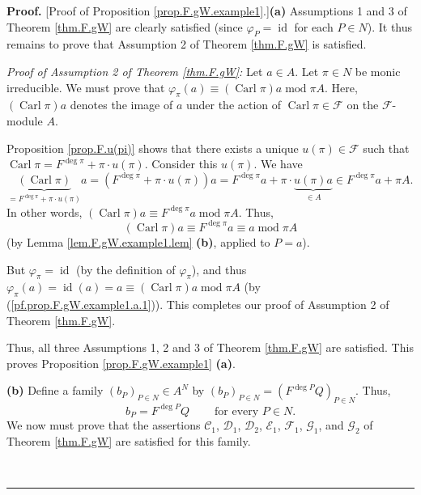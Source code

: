\documentclass[numbers=enddot,12pt,final,onecolumn,notitlepage]{scrartcl}%
\theoremstyle{definition}
\newenvironment{proof}[1][Proof]{\noindent\textbf{#1.} }{\ \rule{0.5em}{0.5em}}
\begin{document}
\begin{proof}
[Proof of Proposition \ref{prop.F.gW.example1}.]\textbf{(a)} Assumptions 1 and
3 of Theorem \ref{thm.F.gW} are clearly satisfied (since $\varphi
_{P}=\operatorname*{id}$ for each $P\in N$). It thus remains to prove that
Assumption 2 of Theorem \ref{thm.F.gW} is satisfied.

\textit{Proof of Assumption 2 of Theorem \ref{thm.F.gW}:} Let $a\in A$. Let
$\pi\in N$ be monic irreducible. We must prove that $\varphi_{\pi}\left(
a\right)  \equiv\left(  \operatorname*{Carl}\pi\right)  a\operatorname{mod}\pi
A$. Here, $\left(  \operatorname*{Carl}\pi\right)  a$ denotes the image of $a$
under the action of $\operatorname*{Carl}\pi\in\mathcal{F}$ on the
$\mathcal{F}$-module $A$.

Proposition \ref{prop.F.u(pi)} shows that there exists a unique $u\left(
\pi\right)  \in\mathcal{F}$ such that $\operatorname*{Carl}\pi=F^{\deg\pi}%
+\pi\cdot u\left(  \pi\right)  $. Consider this $u\left(  \pi\right)  $. We
have%
\[
\underbrace{\left(  \operatorname*{Carl}\pi\right)  }_{=F^{\deg\pi}+\pi\cdot
u\left(  \pi\right)  }a=\left(  F^{\deg\pi}+\pi\cdot u\left(  \pi\right)
\right)  a=F^{\deg\pi}a+\pi\cdot\underbrace{u\left(  \pi\right)  a}_{\in A}\in
F^{\deg\pi}a+\pi A.
\]
In other words, $\left(  \operatorname*{Carl}\pi\right)  a\equiv F^{\deg\pi
}a\operatorname{mod}\pi A$. Thus,%
\begin{equation}
\left(  \operatorname*{Carl}\pi\right)  a\equiv F^{\deg\pi}a\equiv
a\operatorname{mod}\pi A \label{pf.prop.F.gW.example1.a.1}%
\end{equation}
(by Lemma \ref{lem.F.gW.example1.lem} \textbf{(b)}, applied to $P=a$).

But $\varphi_{\pi}=\operatorname*{id}$ (by the definition of $\varphi_{\pi}$),
and thus $\varphi_{\pi}\left(  a\right)  =\operatorname*{id}\left(  a\right)
=a\equiv\left(  \operatorname*{Carl}\pi\right)  a\operatorname{mod}\pi A$ (by
(\ref{pf.prop.F.gW.example1.a.1})). This completes our proof of Assumption 2
of Theorem \ref{thm.F.gW}.

Thus, all three Assumptions 1, 2 and 3 of Theorem \ref{thm.F.gW} are
satisfied. This proves Proposition \ref{prop.F.gW.example1} \textbf{(a)}.

\textbf{(b)} Define a family $\left(  b_{P}\right)  _{P\in N}\in A^{N}$ by
$\left(  b_{P}\right)  _{P\in N}=\left(  F^{\deg P}Q\right)  _{P\in N}$. Thus,%
\begin{equation}
b_{P}=F^{\deg P}Q\ \ \ \ \ \ \ \ \ \ \text{for every }P\in N.
\label{pf.prop.F.gW.example1.b.bP=}%
\end{equation}
We now must prove that the assertions $\mathcal{C}_{1}$, $\mathcal{D}_{1}$,
$\mathcal{D}_{2}$, $\mathcal{E}_{1}$, $\mathcal{F}_{1}$, $\mathcal{G}_{1}$,
and $\mathcal{G}_{2}$ of Theorem \ref{thm.F.gW} are satisfied for this family.


\end{proof}
\end{document}

